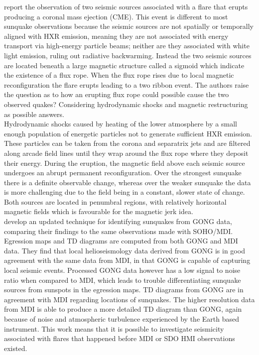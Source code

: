 \cite{2011ApJ...741L..35Z} report the observation of two seismic sources associated with a flare that erupts producing a coronal mass ejection (CME). This event is different to most sunquake observations because the seismic sources are not spatially or temporally aligned with HXR emission, meaning they are not associated with energy transport via high-energy particle beams; neither are they associated with white light emission, ruling out radiative backwarming. Instead the two seismic sources are located beneath a large magnetic structure called a sigmoid which indicate the existence of a flux rope. When the flux rope rises due to local magnetic reconfiguration the flare erupts leading to a two ribbon event. The authors raise the question as to how an erupting flux rope could possible cause the two observed quakes? Considering hydrodynamic shocks and magnetic restructuring as possible answers.\\
Hydrodynamic shocks caused by heating of the lower atmosphere by a small enough population of energetic particles not to generate sufficient HXR emission. These particles can be taken from the corona and separatrix jets and are filtered along arcade field lines until they wrap around the flux rope where they deposit their energy. During the eruption, the magnetic field above each seismic source undergoes an abrupt permanent reconfiguration. Over the strongest sunquake there is a definite observable change, whereas over the weaker sunquake the data is more challenging due to the field being in a constant, slower state of change. Both sources are located in penumbral regions, with relatively horizontal magnetic fields which is favourable for the magnetic jerk idea.\\


\cite{2011ApJ...739...70Z} develop an updated technique for identifying sunquakes from GONG data, comparing their findings to the same observations made with SOHO/MDI. Egression maps and TD diagrams are computed from both GONG and MDI data. They find that local helioseismology data derived from GONG is in good agreement with the same data from MDI, in that GONG is capable of capturing local seismic events. Processed GONG data however has a low signal to noise ratio when compared to MDI, which leads to trouble differentiating sunquake sources from sunspots in the egression maps. TD diagrams from GONG are in agreement with MDI regarding locations of sunquakes. The higher resolution data from MDI is able to produce a more detailed TD diagram than GONG, again because of noise and atmospheric turbulence experienced by the Earth based instrument. This work means that it is possible to investigate seismicity associated with flares that happened before MDI or SDO HMI observations existed.\\    



